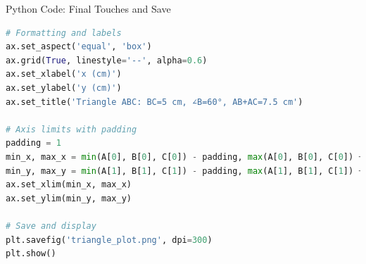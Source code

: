 \documentclass{beamer}
\begin{document}
\begin{frame}[fragile]{Python Code: Final Touches and Save}
\begin{lstlisting}[language=Python]
# Formatting and labels
ax.set_aspect('equal', 'box')
ax.grid(True, linestyle='--', alpha=0.6)
ax.set_xlabel('x (cm)')
ax.set_ylabel('y (cm)')
ax.set_title('Triangle ABC: BC=5 cm, ∠B=60°, AB+AC=7.5 cm')

# Axis limits with padding
padding = 1
min_x, max_x = min(A[0], B[0], C[0]) - padding, max(A[0], B[0], C[0]) + padding
min_y, max_y = min(A[1], B[1], C[1]) - padding, max(A[1], B[1], C[1]) + padding
ax.set_xlim(min_x, max_x)
ax.set_ylim(min_y, max_y)

# Save and display
plt.savefig('triangle_plot.png', dpi=300)
plt.show()
\end{lstlisting}
\end{frame}
\end{document}
